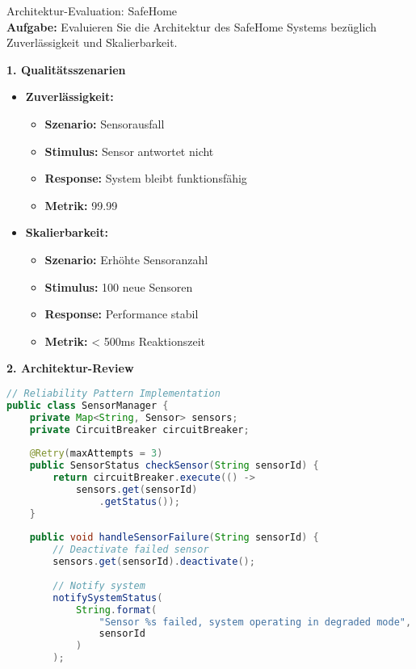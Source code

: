 \begin{example2}[breakable]{Architektur-Evaluation: SafeHome}\\
\textbf{Aufgabe:} Evaluieren Sie die Architektur des SafeHome Systems bezüglich Zuverlässigkeit und Skalierbarkeit.

\textbf{1. Qualitätsszenarien}
\begin{itemize}
    \item \textbf{Zuverlässigkeit:}
    \begin{itemize}
        \item \textbf{Szenario:} Sensorausfall
        \item \textbf{Stimulus:} Sensor antwortet nicht
        \item \textbf{Response:} System bleibt funktionsfähig
        \item \textbf{Metrik:} 99.99%
    \end{itemize}
    
    \item \textbf{Skalierbarkeit:}
    \begin{itemize}
        \item \textbf{Szenario:} Erhöhte Sensoranzahl
        \item \textbf{Stimulus:} 100 neue Sensoren
        \item \textbf{Response:} Performance stabil
        \item \textbf{Metrik:} < 500ms Reaktionszeit
    \end{itemize}
\end{itemize}

\textbf{2. Architektur-Review}
\begin{lstlisting}[language=Java, style=basesmol]
// Reliability Pattern Implementation
public class SensorManager {
    private Map<String, Sensor> sensors;
    private CircuitBreaker circuitBreaker;
    
    @Retry(maxAttempts = 3)
    public SensorStatus checkSensor(String sensorId) {
        return circuitBreaker.execute(() -> 
            sensors.get(sensorId)
                .getStatus());
    }
    
    public void handleSensorFailure(String sensorId) {
        // Deactivate failed sensor
        sensors.get(sensorId).deactivate();
        
        // Notify system
        notifySystemStatus(
            String.format(
                "Sensor %s failed, system operating in degraded mode",
                sensorId
            )
        );
        

\end{lstlisting}
\end{example2}
